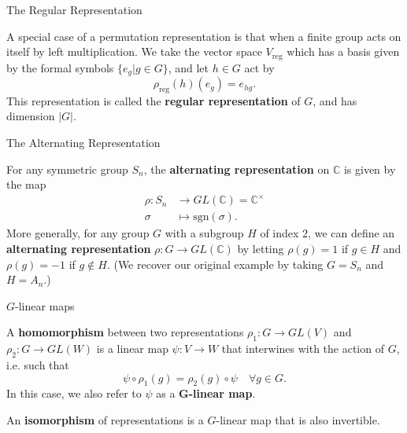 \begin{frame}{The Regular Representation}
\begin{example}
A special case of a permutation representation is that when a finite group acts on itself by left multiplication. We take the vector space $V_{\text{reg}}$ which has a basis given by the formal symbols $\{ e_g | g \in G \}$, and let $h \in G$ act by \[\rho_{\text{reg}}(h) (e_g) = e_{hg}.\]  This representation is called the \textbf{regular representation} of $G$, and has dimension $|G|$.  
 \end{example}
\end{frame}

\begin{frame}{The Alternating Representation}
\begin{example}
For any symmetric group $S_n$, the \textbf{alternating representation} on $\mathbb{C}$ is given by the map 
\begin{align*}
\rho \colon S_n &\to GL(\mathbb{C})=\mathbb{C}^\times \\
\sigma & \mapsto \text{sgn}(\sigma).
\end{align*} More generally, for any group $G$ with a subgroup $H$ of index $2$, we can define an \textbf{alternating representation} $\rho \colon G \to GL(\mathbb{C})$ by letting $\rho(g) = 1$ if $g \in H$ and $\rho(g) = -1$ if $g \notin H$.  (We recover our original example  by taking $G= S_n$ and $H=A_n$.) 
\end{example}
\end{frame}

\begin{frame}{$G$-linear maps}
\begin{definition}
A \textbf{homomorphism} between two representations $\rho_1 \colon G \to GL(V)$ and $\rho_2 \colon G \to GL(W)$ is a linear map $\psi \colon V \to W$ that interwines with the action of $G$, i.e. such that
\[ \psi \circ \rho_1 (g)= \rho_2(g) \circ \psi \quad \forall  g \in G. \]  
In this case, we also refer to $\psi$ as a $\mathbf{G}$\textbf{-linear map}.
\end{definition}
\begin{definition}
An \textbf{isomorphism} of representations is a $G$-linear map that is also invertible.
\end{definition}
\end{frame}

